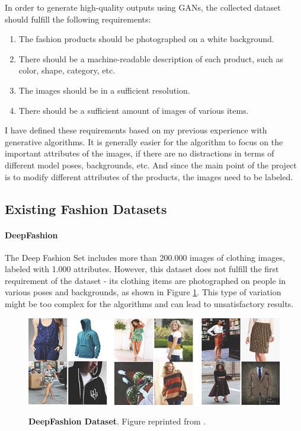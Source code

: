 \documentclass[12pt]{report}
\begin{document}
In order to generate high-quality outputs using GANs, the collected dataset should fulfill the following requirements:
\begin{enumerate}
\item The fashion products should be photographed on a white background. 
\item There should be a machine-readable description of each product, such as color, shape, category, etc. 
\item The images should be in a sufficient resolution.
\item There should be a sufficient amount of images of various items.

\end{enumerate}
I have defined these requirements based on my previous experience with generative algorithms. It is generally easier for the algorithm to focus on the important attributes of the images, if there are no distractions in terms of different model poses, backgrounds, etc. And since the main point of the project is to modify different attributes of the products, the images need to be labeled.

\pagebreak
\subsection{Existing Fashion Datasets}
\paragraph{DeepFashion}
The Deep Fashion Set \cite{liu2016deepfashion} includes more than 200.000 images of clothing images, labeled with 1.000 attributes. However, this dataset does not fulfill the first requirement of the dataset - its clothing items are photographed on people in various poses and backgrounds, as shown in Figure \ref{fig:deepfashion}. This type of variation might be too complex for the algorithms and can lead to unsatisfactory results.

\begin{figure}[h]
\centering
{\includegraphics[width=\linewidth]{03_analysis/data/deepfashion}}
\caption{\label{fig:deepfashion} \textbf{DeepFashion Dataset}. Figure reprinted from \cite{liu2016deepfashion}.}
\end{figure}
\end{document}
